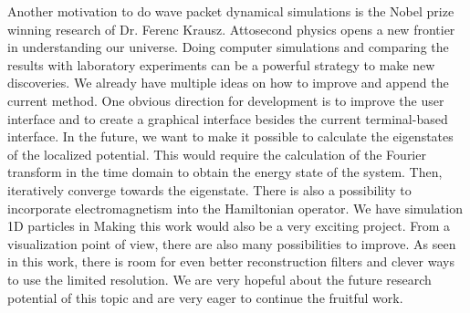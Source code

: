 Another motivation to do wave packet dynamical simulations is the Nobel prize winning research of Dr. Ferenc Krausz. Attosecond physics opens a new frontier in understanding our universe.
Doing computer simulations and comparing the results with laboratory experiments can be a powerful strategy to make new discoveries.
We already have multiple ideas on how to improve and append the current method.
One obvious direction for development is to improve the user interface and to create a graphical interface besides the current terminal-based interface.
In the future, we want to make it possible to calculate the eigenstates of the localized potential.
This would require the calculation of the Fourier transform in the time domain to obtain the energy state of the system.
Then, iteratively converge towards the eigenstate.
There is also a possibility to incorporate electromagnetism into the Hamiltonian operator.
We have simulation 1D particles in
Making this work would also be a very exciting project.
From a visualization point of view, there are also many possibilities to improve.
As seen in this work, there is room for even better reconstruction filters
and clever ways to use the limited resolution.
We are very hopeful about the future research potential of this topic and are very eager to continue the fruitful work.



